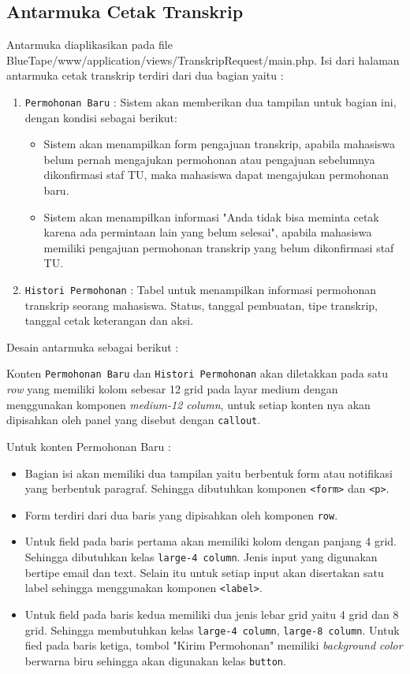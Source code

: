 \subsection{Antarmuka Cetak Transkrip}
Antarmuka diaplikasikan pada file BlueTape/www/application/views/TranskripRequest/main.php. Isi dari halaman antarmuka cetak transkrip terdiri dari dua bagian yaitu :
\begin{enumerate}
	\item \verb|Permohonan Baru| : Sistem akan memberikan dua tampilan untuk bagian ini, dengan kondisi sebagai berikut:
	\begin{itemize}
		\item Sistem akan menampilkan form pengajuan transkrip, apabila mahasiswa belum pernah mengajukan permohonan atau pengajuan sebelumnya  dikonfirmasi staf TU, maka mahasiswa dapat mengajukan permohonan baru.
		\item Sistem akan menampilkan informasi "Anda tidak bisa meminta cetak karena ada permintaan lain yang belum selesai", apabila mahasiswa memiliki pengajuan permohonan transkrip yang belum dikonfirmasi staf TU. 
	\end{itemize}
	\item \verb|Histori Permohonan| : Tabel untuk menampilkan informasi permohonan transkrip seorang mahasiswa. Status, tanggal pembuatan, tipe transkrip, tanggal cetak keterangan dan aksi. 
\end{enumerate}
Desain antarmuka sebagai berikut : \par
Konten \texttt{Permohonan Baru} dan \texttt{Histori Permohonan} akan diletakkan pada satu \textit{row} yang memiliki kolom sebesar 12 grid pada layar medium dengan menggunakan komponen \textit{medium-12 column}, untuk setiap konten nya akan dipisahkan oleh panel yang disebut dengan \texttt{callout}. \par
Untuk konten Permohonan Baru :
\begin{itemize}
	\item Bagian isi akan memiliki dua tampilan yaitu berbentuk form atau notifikasi yang berbentuk paragraf. Sehingga dibutuhkan komponen \verb|<form>| dan \verb|<p>|.
	\item Form terdiri dari dua baris yang dipisahkan oleh komponen \texttt{row}.
	\item Untuk field pada baris pertama akan memiliki kolom dengan panjang 4 grid. Sehingga dibutuhkan kelas \verb|large-4 column|. Jenis input yang digunakan bertipe email dan text. Selain itu untuk setiap input akan disertakan satu label sehingga menggunakan komponen \texttt{<label>}.
	\item Untuk field pada baris kedua memiliki dua jenis lebar grid yaitu 4 grid dan 8 grid. Sehingga membutuhkan kelas \verb|large-4 column|, \verb|large-8 column|. Untuk fied pada baris ketiga, tombol "Kirim Permohonan" memiliki \textit{background color} berwarna biru sehingga akan digunakan kelas \verb|button|.
\end{itemize}

